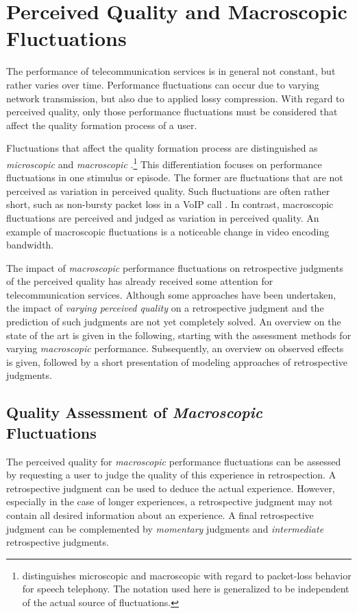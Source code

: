 \section{Perceived Quality and Macroscopic Fluctuations}\label{chap:04}
The performance of telecommunication services is in general not constant, but rather varies over time.
Performance fluctuations can occur due to varying network transmission, but also due to applied lossy compression.
With regard to perceived quality, only those performance fluctuations must be considered that affect the quality formation process of a user.

Fluctuations that affect the quality formation process are distinguished as \emph{microscopic} and \emph{macroscopic} \citep[][p.\,72]{raake_short-_2006}.\footnote{\citet{raake_short-_2006} distinguishes microscopic and macroscopic with regard to packet-loss behavior for speech telephony. The notation used here is generalized to be independent of the actual source of fluctuations.}
This differentiation focuses on performance fluctuations in one stimulus or episode.
The former are fluctuations that are not perceived as variation in perceived quality.
Such fluctuations are often rather short, such as non-bursty packet loss in a \ac{VoIP} call \citep[\cf{}][p.\,72]{raake_short-_2006}.
In contrast, macroscopic fluctuations are perceived and judged as variation in perceived quality.
An example of macroscopic fluctuations is a noticeable change in video encoding bandwidth.

The impact of \emph{macroscopic} performance fluctuations on retrospective judgments of the perceived quality has already received some attention for telecommunication services.
Although some approaches have been undertaken, the impact of \emph{varying perceived quality} on a retrospective judgment and the prediction of such judgments are not yet completely solved.
An overview on the state of the art is given in the following, starting with the assessment methods for varying \emph{macroscopic} performance.
Subsequently, an overview on observed effects is given, followed by a short presentation of modeling approaches of retrospective judgments.

\subsection{Quality Assessment of \emph{Macroscopic} Fluctuations}
The perceived quality for \emph{macroscopic} performance fluctuations can be assessed by requesting a user to judge the quality of this experience in retrospection.
A retrospective judgment can be used to deduce the actual experience.
However, especially in the case of longer experiences, a retrospective judgment may not contain all desired information about an experience.
A final retrospective judgment can be complemented by \emph{momentary} judgments and \emph{intermediate} retrospective judgments.

